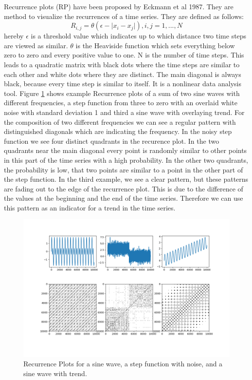 \documentclass{article}
\begin{document}
Recurrence plots (RP) have been proposed by Eckmann et al 1987. They are method to visualize the recurrences of a time series.
They are defined as follows:
$$R_{i,j} = \theta(\epsilon - \lvert x_i - x_j \rvert), i,j = 1,...,N$$
hereby $\epsilon$ is a threshold value which indicates up to which distance two time steps are viewed as similar.
$\theta$ is the Heaviside function which sets everything below zero to zero and every positive value to one.
N is the number of time steps.
This leads to a quadratic matrix with black dots where the time steps are similar to each other and white dots where they are distinct.
The main diagonal is always black, because every time step is similar to itself.
It is a nonlinear data analysis tool.
Figure \ref{rplots} shows example Recurrence plots of a sum of two sine waves with different frequencies,
a step function from three to zero with an overlaid white noise with standard deviation 1 and third a sine wave with overlaying trend.
For the composition of two different frequencies we can see a regular pattern with distinguished diagonals which are indicating the frequency.
In the noisy step function we see four distinct quadrants in the recurence plot.
In the two quadrants near the main diagonal every point is randomly similar to other points in this part of the time series with a high probability.
In the other two quadrants, the probability is low, that two points are similar to a point in the other part of the step function.
In the third example, we see a clear pattern, but these patterns are fading out to the edge of the recurrence plot.
This is due to the difference of the values at the beginning and the end of the time series.
Therefore we can use this pattern as an indicator for a trend in the time series.

\begin{figure}
  \includegraphics[width=\textwidth]{figs/rp_methods.png}
  \caption{Recurrence Plots for a sine wave, a step function with noise, and a sine wave with trend.}
  \label{rplots}
\end{figure}
\end{document}
